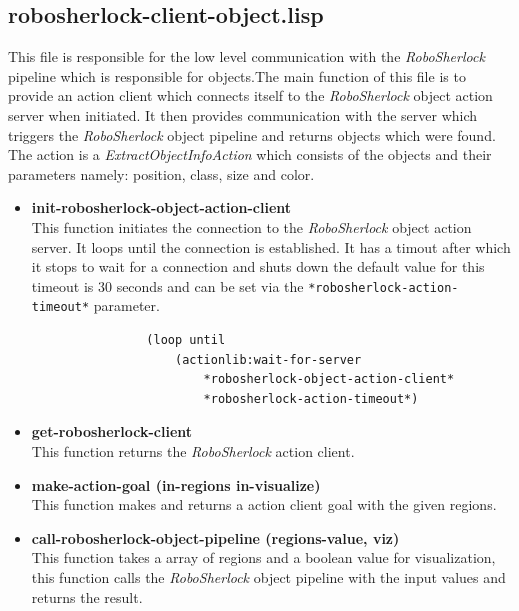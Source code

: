 \documentclass[main.tex]{subfiles}
\begin{document}
		\subsection{robosherlock-client-object.lisp}
		\label{object-perceive}
		This file is responsible for the low level communication with the \textit{RoboSherlock} pipeline which is responsible for objects.The main function of this file is to provide an action client which connects itself to the \textit{RoboSherlock} object action server when initiated. It then provides communication with the server which triggers the \textit{RoboSherlock} object pipeline and returns objects which were found. The action is a \textit{ExtractObjectInfoAction} which consists of the objects and their parameters namely: position, class, size and color.
		\begin{itemize}
			\item \textbf{init-robosherlock-object-action-client} \\
			This function initiates the connection to the \textit{RoboSherlock} object action server. It loops until the connection is established. It has a timout after which it stops to wait for a connection and shuts down the default value for this timeout is 30 seconds and can be set via the \texttt{*robosherlock-action-timeout*} parameter.
			\begin{lstlisting}
				(loop until 
					(actionlib:wait-for-server 
						*robosherlock-object-action-client*
						*robosherlock-action-timeout*)
			\end{lstlisting}
			\item \textbf{get-robosherlock-client} \\
			This function returns the \textit{RoboSherlock} action client.
			\item \textbf{make-action-goal (in-regions in-visualize)} \\
			This function makes and returns a action client goal with the given regions.
			\item \textbf{call-robosherlock-object-pipeline (regions-value, viz)} \\
			This function takes a array of regions and a boolean value for visualization, this function calls the \textit{RoboSherlock} object pipeline with the input values and returns the result.
		\end{itemize}
\end{document}
